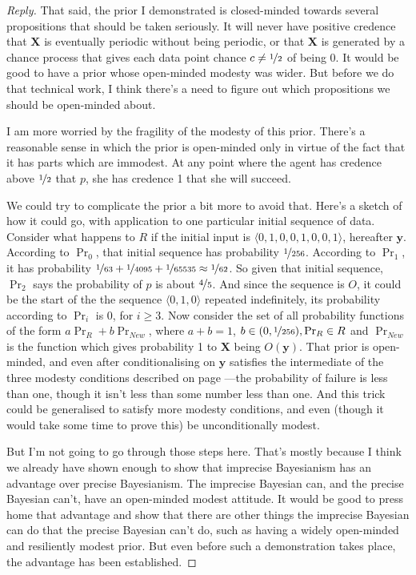 \documentclass{ergoclass}
\newcommand{\vX}{\boldsymbol{X}}
\newcommand{\vy}{\boldsymbol{y}}
\begin{document}
\begin{proof}[Reply]
That said, the prior I demonstrated is closed-minded towards several propositions that should be taken seriously. It will never have positive credence that $\vX$ is eventually periodic without being periodic, or that $\vX$ is generated by a chance process that gives each data point chance $c \neq \nicefrac{1}{2}$ of being 0. It would be good to have a prior whose open-minded modesty was wider. But before we do that technical work, I think there's a need to figure out which propositions we should be open-minded about.

I am more worried by the fragility of the modesty of this prior. There's a reasonable sense in which the prior is open-minded only in virtue of the fact that it has parts which are immodest. At any point where the agent has credence above $\nicefrac{1}{2}$ that $p$, she has credence 1 that she will succeed.

We could try to complicate the prior a bit more to avoid that. Here's a sketch of how it could go, with application to one particular initial sequence of data. Consider what happens to $R$ if the initial input is $\langle 0, 1, 0, 0, 1, 0, 0, 1\rangle$, hereafter $\vy$. According to $\Pr_0$, that initial sequence has probability $\nicefrac{1}{256}$. According to $\Pr_1$, it has probability $\nicefrac{1}{63} + \nicefrac{1}{4095} + \nicefrac{1}{65535} \approx \nicefrac{1}{62}$. So given that initial sequence, $\Pr_2$ says the probability of $p$ is about $\nicefrac{4}{5}$. And since the sequence is $O$, it could be the start of the the sequence $\langle 0, 1, 0\rangle$ repeated indefinitely, its probability according to $\Pr_i$ is 0, for $i \geq 3$. Now consider the set of all probability functions of the form $a\Pr_{R} + b\Pr_{New}$, where $a + b = 1$, $b \in (0, \nicefrac{1}{256}), \Pr_{R} \in R$ and $\Pr_{New}$ is the function which gives probability 1 to $\vX$ being $O(\vy)$. That prior is open-minded, and even after conditionalising on $\vy$ satisfies the intermediate of the three modesty conditions described on page \pageref{ModestDef}---the probability of failure is less than one, though it isn't less than some number less than one. And this trick could be generalised to satisfy more modesty conditions, and even (though it would take some time to prove this) be unconditionally modest.

But I'm not going to go through those steps here. That's mostly because I think we already have shown enough to show that imprecise Bayesianism has an advantage over precise Bayesianism. The imprecise Bayesian can, and the precise Bayesian can't, have an open-minded modest attitude. It would be good to press home that advantage and show that there are other things the imprecise Bayesian can do that the precise Bayesian can't do, such as having a widely open-minded and resiliently modest prior. But even before such a demonstration takes place, the advantage has been established.
\end{proof}
\end{document}
